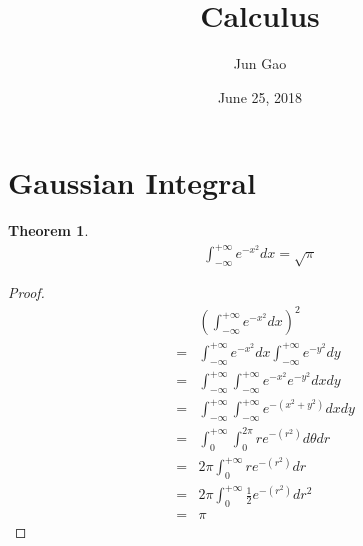 \documentclass[12pt]{article}
\newtheorem{theorem}{Theorem}[section]
\begin{document}
 
\title{Calculus}
\author{Jun Gao}
\date{June 25, 2018}

\maketitle
\section{Gaussian Integral}
\begin{theorem}
	\begin{eqnarray}
	\int_{-\infty}^{+\infty} e^{-x^2} dx = \sqrt{\pi}
	\end{eqnarray}
\end{theorem}
\begin{proof}
\begin{eqnarray}
	&&\left(\int_{-\infty}^{+\infty} e^{-x^2} dx\right)^2\\
	&=&\int_{-\infty}^{+\infty} e^{-x^2} dx \int_{-\infty}^{+\infty} e^{-y^2} dy\\
	&=& \int_{-\infty}^{+\infty}\int_{-\infty}^{+\infty} e^{-x^2} e^{-y^2} dxdy\\
	&=&\int_{-\infty}^{+\infty}\int_{-\infty}^{+\infty} e^{-(x^2+y^2)}dxdy\\
	&=&\int_{0}^{+\infty}\int_{0}^{2\pi} re^{-(r^2)}d\theta dr\\
	&=&2\pi \int_{0}^{+\infty}re^{-(r^2)} dr\\
	&=&2\pi \int_{0}^{+\infty}\frac{1}{2}e^{-(r^2)} dr^2\\
	&=&\pi
\end{eqnarray}
\end{proof}
\end{document}
